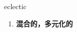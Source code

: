 
\begin{frame}
{\huge eclectic}
\begin{center}
\begin{enumerate}\Large
  \item \textbf{混合的，多元化的}
\end{enumerate}
\end{center}
\end{frame}
